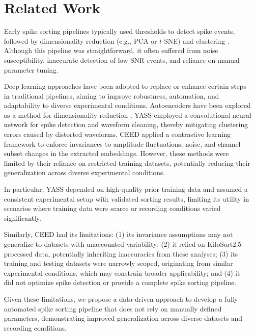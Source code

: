 \section{Related Work}
Early spike sorting pipelines typically used thresholds to detect spike events, followed by dimensionality reduction (e.g., PCA or $t$-SNE) and clustering \cite{FRS1901LIIIOL, maatenVisualizingDataUsing2008, veerabhadrappaCompatibilityEvaluationClustering2020}. Although this pipeline was straightforward, it often suffered from noise susceptibility, inaccurate detection of low SNR events, and reliance on manual parameter tuning.

Deep learning approaches have been adopted to replace or enhance certain steps in traditional pipelines, aiming to improve robustness, automation, and adaptability to diverse experimental conditions. Autoencoders have been explored as a method for dimensionality reduction \cite{baldiAutoencodersUnsupervisedLearning2012, wuLearningSortFewshot2019, eomDeeplearnedSpikeRepresentations2021}. YASS \cite{leeYASSAnotherSpike2017} employed a convolutional neural network for spike detection and waveform cleaning, thereby mitigating clustering errors caused by distorted waveforms. CEED \cite{vishnubhotlaRobustGeneralizableRepresentations2023} applied a contrastive learning framework to enforce invariances to amplitude fluctuations, noise, and channel subset changes in the extracted embeddings. However, these methods were limited by their reliance on restricted training datasets, potentially reducing their generalization across diverse experimental conditions.

In particular, YASS depended on high-quality prior training data and assumed a consistent experimental setup with validated sorting results, limiting its utility in scenarios where training data were scarce or recording conditions varied significantly. 

Similarly, CEED had its limitations: (1) its invariance assumptions may not generalize to datasets with unaccounted variability; (2) it relied on KiloSort2.5-processed data, potentially inheriting inaccuracies from these analyses; (3) its training and testing datasets were narrowly scoped, originating from similar experimental conditions, which may constrain broader applicability; and (4) it did not optimize spike detection or provide a complete spike sorting pipeline.

Given these limitations, we propose a data-driven approach to develop a fully automated spike sorting pipeline that does not rely on manually defined parameters, demonstrating improved generalization across diverse datasets and recording conditions.